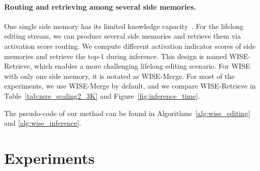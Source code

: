 \documentclass{article}
\begin{document}
\paragraph{Routing and retrieving among several side memories.} One single side memory has its limited knowledge capacity~\cite{knowledge_capacity}. For the lifelong editing stream, we can produce several side memories and retrieve them via activation score routing. We compute different activation indicator scores of side memories and retrieve the top-1 during inference. This design is named WISE-Retrieve, which enables a more challenging lifelong editing scenario.
For WISE with only one side memory, it is notated as WISE-Merge. 
For most of the experiments, we use WISE-Merge by default, and we compare WISE-Retrieve in Table~\ref{tab:zsre_scaling2_3K} and Figure~\ref{fig:inference_time}.

The pseudo-code of our method can be found in Algorithms~\ref{alg:wise_editing} and \ref{alg:wise_inference}.


\section{Experiments}\label{sec:exp}

    
    
\end{document}
